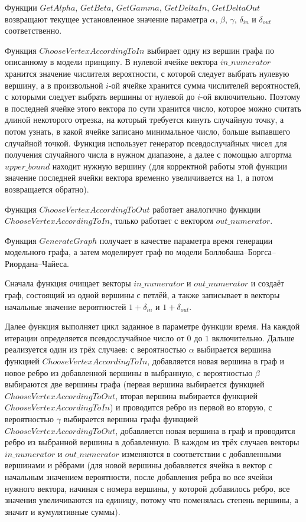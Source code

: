 \documentclass[14pt]{extreport}
\begin{document}
Функции $GetAlpha$, $GetBeta$, $GetGamma$, $GetDeltaIn$, $GetDeltaOut$ возвращают текущее установленное значение параметра $\alpha$, $\beta$, $\gamma$, $\delta_{in}$ и $\delta_{out}$ соответственно.

Функция $ChooseVertexAccordingToIn$ выбирает одну из вершин графа по описанному в модели принципу. В нулевой ячейке вектора $in\_numerator$ хранится значение числителя вероятности, с которой следует выбрать нулевую вершину, а в произвольной $i$-ой ячейке хранится сумма числителей вероятностей, с которыми следует выбрать вершины от нулевой до $i$-ой включительно. Поэтому в последней ячейке этого вектора по сути хранится число, которое можно считать длиной некоторого отрезка, на который требуется кинуть случайную точку, а потом узнать, в какой ячейке записано минимальное число, больше выпавшего случайной точкой. Функция использует генератор псевдослучайных чисел для получения случайного числа в нужном диапазоне, а далее с помощью алгортма $upper\_bound$ находит нужную вершину (для корректной работы этой функции значение последней ячейки вектора временно увеличивается на 1, а потом возвращается обратно).

Функция $ChooseVertexAccordingToOut$ работает аналогично функции $ChooseVertexAccordingToIn$, только работает с вектором $out\_numerator$.

Функция $GenerateGraph$ получает в качестве параметра время генерации модельного графа, а затем моделирует граф по модели Боллобаша--Боргса--Риордана--Чайеса.

Сначала функция очищает векторы $in\_numerator$ и $out\_numerator$ и создаёт граф, состоящий из одной вершины с петлёй, а также записывает в векторы начальные значение вероятностей $1 + \delta_{in}$ и $1 + \delta_{out}$.

Далее функция выполняет цикл заданное в параметре функции время. На каждой итерации определяется псевдослучайное число от $0$ до $1$ включительно. Дальше реализуется один из трёх случаев: с вероятностью $\alpha$ выбирается вершина функцией $ChooseVertexAccordingToIn$, добавляется новая вершина в граф и новое ребро из добавленной вершины в выбранную, с вероятностью $\beta$ выбираются две вершины графа (первая вершина выбирается функцией $ChooseVertexAccordingToOut$, вторая вершина выбирается функцией $ChooseVertexAccordingToIn$) и проводится ребро из первой во вторую, с вероятностью $\gamma$ выбирается вершина графа функцией $ChooseVertexAccordingToOut$, добавляется новая вершина в граф и проводится ребро из выбранной вершины в добавленную. В каждом из трёх случаев векторы $in\_numerator$ и $out\_numerator$ изменяются в соответствии с добавленными вершинами и рёбрами (для новой вершины добавляется ячейка в вектор с начальным значением вероятности, после добавления ребра во все ячейки нужного вектора, начиная с номера вершины, у которой добавилось ребро, все значения увеличиваются на единицу, потому что поменялась степень вершины, а значит и кумулятивные суммы).
\end{document}
